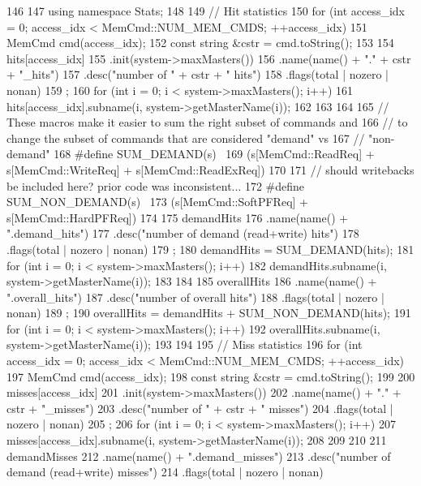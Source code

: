 \begin{DoxyCode}
146 {
147     using namespace Stats;
148 
149     // Hit statistics
150     for (int access_idx = 0; access_idx < MemCmd::NUM_MEM_CMDS; ++access_idx) {
151         MemCmd cmd(access_idx);
152         const string &cstr = cmd.toString();
153 
154         hits[access_idx]
155             .init(system->maxMasters())
156             .name(name() + "." + cstr + "_hits")
157             .desc("number of " + cstr + " hits")
158             .flags(total | nozero | nonan)
159             ;
160         for (int i = 0; i < system->maxMasters(); i++) {
161             hits[access_idx].subname(i, system->getMasterName(i));
162         }
163     }
164 
165 // These macros make it easier to sum the right subset of commands and
166 // to change the subset of commands that are considered "demand" vs
167 // "non-demand"
168 #define SUM_DEMAND(s) \
169     (s[MemCmd::ReadReq] + s[MemCmd::WriteReq] + s[MemCmd::ReadExReq])
170 
171 // should writebacks be included here?  prior code was inconsistent...
172 #define SUM_NON_DEMAND(s) \
173     (s[MemCmd::SoftPFReq] + s[MemCmd::HardPFReq])
174 
175     demandHits
176         .name(name() + ".demand_hits")
177         .desc("number of demand (read+write) hits")
178         .flags(total | nozero | nonan)
179         ;
180     demandHits = SUM_DEMAND(hits);
181     for (int i = 0; i < system->maxMasters(); i++) {
182         demandHits.subname(i, system->getMasterName(i));
183     }
184 
185     overallHits
186         .name(name() + ".overall_hits")
187         .desc("number of overall hits")
188         .flags(total | nozero | nonan)
189         ;
190     overallHits = demandHits + SUM_NON_DEMAND(hits);
191     for (int i = 0; i < system->maxMasters(); i++) {
192         overallHits.subname(i, system->getMasterName(i));
193     }
194 
195     // Miss statistics
196     for (int access_idx = 0; access_idx < MemCmd::NUM_MEM_CMDS; ++access_idx) {
197         MemCmd cmd(access_idx);
198         const string &cstr = cmd.toString();
199 
200         misses[access_idx]
201             .init(system->maxMasters())
202             .name(name() + "." + cstr + "_misses")
203             .desc("number of " + cstr + " misses")
204             .flags(total | nozero | nonan)
205             ;
206         for (int i = 0; i < system->maxMasters(); i++) {
207             misses[access_idx].subname(i, system->getMasterName(i));
208         }
209     }
210 
211     demandMisses
212         .name(name() + ".demand_misses")
213         .desc("number of demand (read+write) misses")
214         .flags(total | nozero | nonan)
}
\end{DoxyCode}
